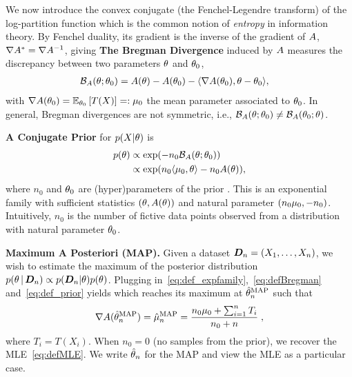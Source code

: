 We now introduce the convex conjugate (the Fenchel-Legendre transform) of the log-partition function
which is the common notion of \textit{entropy} in information theory.
By Fenchel duality, its gradient is the inverse of the gradient of $\logpart$,  $\nabla\conj=\nabla\logpart^{-1}$, giving
{\bf The Bregman Divergence} induced by $\logpart$ measures the discrepancy between two parameters $\nat$ and $\nat_0$,
\begin{align}
    \bregman (\nat ; \nat_0)
    & = \logpart(\nat) - \logpart(\nat_0)
    - \langle \nabla \logpart(\nat_0)  , \nat - \nat_0 \rangle,
    \label{eq:defBregman}
\end{align}
with $\nabla \logpart(\nat_0) = \expect[\nat_0]{T(X)} =: \meanp_0$ the mean parameter associated to $\nat_0$.
In general, Bregman divergences are not symmetric, i.e., $\bregman (\nat ; \nat_0)\neq \bregman (\nat_0 ; \nat)$.

{\bf A Conjugate Prior} for $p(X|\nat)$ is
\begin{align}
    p(\nat)
    &\propto \exp( - n_0 \bregman(\nat ; \nat_0) ) \nonumber \\
    &\propto \exp(n_0 \langle \m_0, \nat \rangle - n_0 \logpart(\nat)),
    \label{eq:def_prior}
\end{align}
where $n_0$ and $\nat_0$ are (hyper)parameters of the prior  \citep{agarwal2010geometric}.
This is an exponential family with sufficient statistics $(\nat ,\logpart(\nat))$ and natural parameter $(n_0 \m_0, -n_0)$.
Intuitively, $n_0$ is the number of fictive data points observed from a distribution with natural parameter $\nat_0$.

{\bf Maximum A Posteriori (MAP).}
Given a dataset $\mD_n =(X_1,\dots,X_n)$, we wish to estimate the maximum of the posterior distribution $p(\nat \cond \mD_n) \propto p(\mD_n|\nat)p(\nat)$.
Plugging in~\eqref{eq:def_expfamily},~\eqref{eq:defBregman} and~\eqref{eq:def_prior} yields
which reaches its maximum at $\MAPt^\text{MAP}$ such that
\begin{align}
    \nabla \logpart(\MAPt^\text{MAP}) = \MAPm^\text{MAP}
    = \frac{n_0 \meanp_0 + \sum_{i=1}^n T_i}{n_0+n} \; ,
    \label{eq:defMAP}
\end{align}
where $T_i=T(X_i)$.
When $n_0=0$ (no samples from the prior), we recover the MLE~\eqref{eq:defMLE}.
We write $\MAPt$ for the MAP and view the MLE as a particular case.


